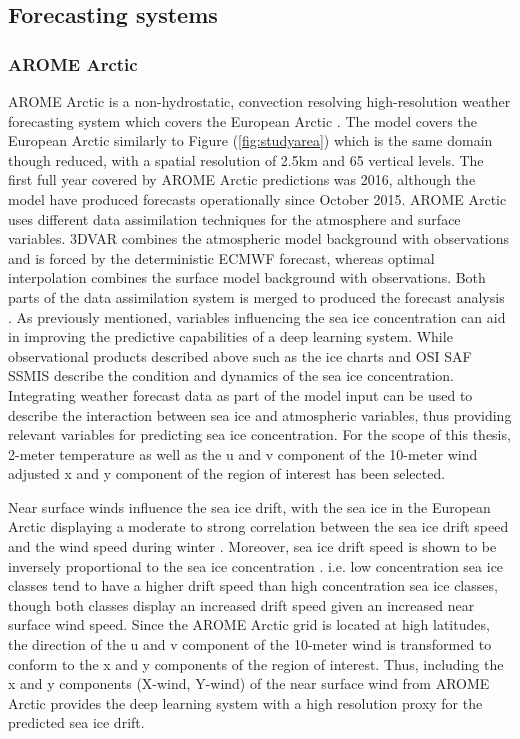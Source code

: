 \documentclass[../main/thesis.tex]{subfiles}
\begin{document}
\subsection{Forecasting systems} 
\subsubsection{AROME Arctic}
\label{sec:arome}
AROME Arctic is a non-hydrostatic, convection resolving high-resolution weather forecasting system which covers the European Arctic \citep{Mueller2017}. The model covers the European Arctic similarly to Figure (\ref{fig:studyarea}) which is the same domain though reduced, with a spatial resolution of 2.5km and 65 vertical levels. The first full year covered by AROME Arctic predictions was 2016, although the model have produced forecasts operationally since October 2015. AROME Arctic uses different data assimilation techniques for the atmosphere and surface variables. 3DVAR combines the atmospheric model background with observations and is forced by the deterministic ECMWF forecast, whereas optimal interpolation combines the surface model background with observations. Both parts of the data assimilation system is merged to produced the forecast analysis \citep{Mueller2017}. As previously mentioned, variables influencing the sea ice concentration can aid in improving the predictive capabilities of a deep learning system. While observational products described above such as the ice charts \citep{Dinessen2020} and OSI SAF SSMIS \citep{Tonboe2017} describe the condition and dynamics of the sea ice concentration. Integrating weather forecast data as part of the model input can be used to describe the interaction between sea ice and atmospheric variables, thus providing relevant variables for predicting sea ice concentration. For the scope of this thesis, 2-meter temperature as well as the u and v component of the 10-meter wind adjusted x and y component of the region of interest has been selected.

Near surface winds influence the sea ice drift, with the sea ice in the European Arctic displaying a moderate to strong correlation between the sea ice drift speed and the wind speed during winter \citep{Spreen2011}. Moreover, sea ice drift speed is shown to be inversely proportional to the sea ice concentration \citep{Yu2020}. i.e. low concentration sea ice classes tend to have a higher drift speed than high concentration sea ice classes, though both classes display an increased drift speed given an increased near surface wind speed. Since the AROME Arctic grid is located at high latitudes, the direction of the u and v component of the 10-meter wind is transformed to conform to the x and y components of the region of interest.
Thus, including the x and y components (X-wind, Y-wind) of the near surface wind from AROME Arctic provides the deep learning system with a high resolution proxy for the predicted sea ice drift. 
\end{document}
